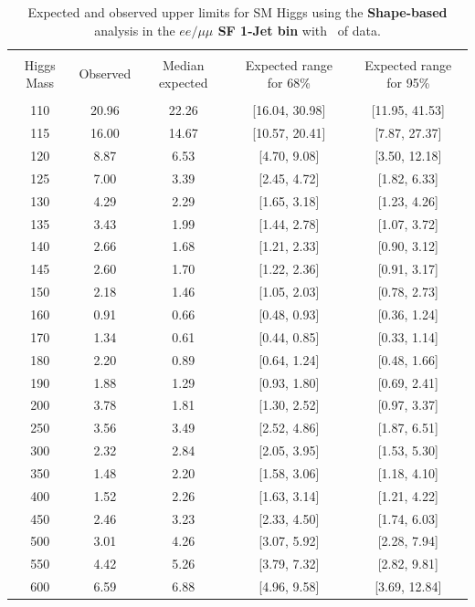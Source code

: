 \begin{table}[hbp!]
\begin{center}
\begin{tabular}{c c c c c}
\hline
\vspace{-3mm} && \\
 Higgs Mass & Observed  & Median expected & Expected range for 68\% & Expected range for 95\%   \\
\vspace{-3mm} && \\
\hline
110 & 20.96 & 22.26 & [16.04, 30.98] & [11.95, 41.53] \\
115 & 16.00 & 14.67 & [10.57, 20.41] & [7.87, 27.37] \\
120 & 8.87 & 6.53 & [4.70, 9.08] & [3.50, 12.18] \\
125 & 7.00 & 3.39 & [2.45, 4.72] & [1.82, 6.33] \\
130 & 4.29 & 2.29 & [1.65, 3.18] & [1.23, 4.26] \\
135 & 3.43 & 1.99 & [1.44, 2.78] & [1.07, 3.72] \\
140 & 2.66 & 1.68 & [1.21, 2.33] & [0.90, 3.12] \\
145 & 2.60 & 1.70 & [1.22, 2.36] & [0.91, 3.17] \\
150 & 2.18 & 1.46 & [1.05, 2.03] & [0.78, 2.73] \\
160 & 0.91 & 0.66 & [0.48, 0.93] & [0.36, 1.24] \\
170 & 1.34 & 0.61 & [0.44, 0.85] & [0.33, 1.14] \\
180 & 2.20 & 0.89 & [0.64, 1.24] & [0.48, 1.66] \\
190 & 1.88 & 1.29 & [0.93, 1.80] & [0.69, 2.41] \\
200 & 3.78 & 1.81 & [1.30, 2.52] & [0.97, 3.37] \\
250 & 3.56 & 3.49 & [2.52, 4.86] & [1.87, 6.51] \\
300 & 2.32 & 2.84 & [2.05, 3.95] & [1.53, 5.30] \\
350 & 1.48 & 2.20 & [1.58, 3.06] & [1.18, 4.10] \\
400 & 1.52 & 2.26 & [1.63, 3.14] & [1.21, 4.22] \\
450 & 2.46 & 3.23 & [2.33, 4.50] & [1.74, 6.03] \\
500 & 3.01 & 4.26 & [3.07, 5.92] & [2.28, 7.94] \\
550 & 4.42 & 5.26 & [3.79, 7.32] & [2.82, 9.81] \\
600 & 6.59 & 6.88 & [4.96, 9.58] & [3.69, 12.84] \\
\hline
\end{tabular}
\caption{Expected and observed upper limits for SM Higgs using the
  {\bf Shape-based} analysis in the {\bf $ee/\mu\mu$ SF 1-Jet bin} with \intlumiEightTeV\ of data.}
\label{tab:bdtbase_uls_1jsf}
\end{center}
\end{table}
\clearpage
